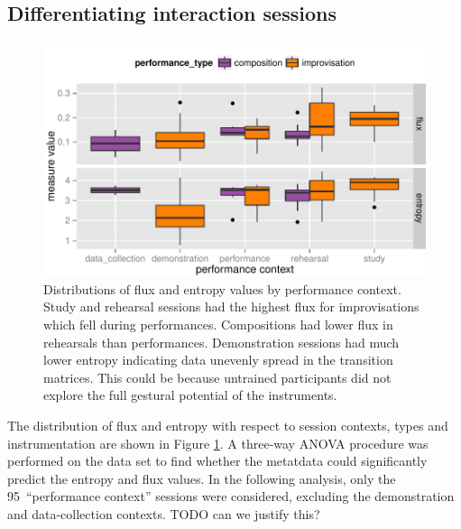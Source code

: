 \documentclass{sigchi}
\begin{document}
\subsection{Differentiating interaction sessions}
\label{differentiating-interaction-sessions}

\begin{figure}
  \centering
  \includegraphics[width=\linewidth]{figures/context-flux-entropy-boxplot}
  \caption{Distributions of flux and entropy values by performance context. Study
    and rehearsal sessions had the highest flux for improvisations
    which fell during performances. Compositions had lower flux in
    rehearsals than performances. Demonstration sessions had much lower entropy
  indicating data unevenly spread in the transition matrices. This
  could be because untrained
  participants did not explore the full gestural potential of the
  instruments. 
  \label{fig:flux-entropy-boxplot}}
\end{figure}


The distribution of flux and entropy with respect to session contexts,
types and instrumentation are shown in Figure
\ref{fig:flux-entropy-boxplot}. A three-way ANOVA procedure was
performed on the data set to find whether the metatdata could
significantly predict the entropy and flux values.
In the following analysis, only the 95~``performance context''
sessions were considered, excluding the demonstration and
data-collection contexts. TODO can we justify this?
\end{document}
